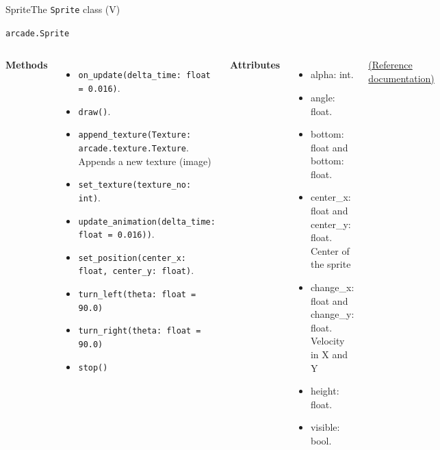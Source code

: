 \documentclass[10pt,compress]{beamer} %
\begin{document}
\begin{frame}[plain]{Sprite}{The \texttt{Sprite} class (V)}
	\begin{block}{\texttt{arcade.Sprite}}
		\smallskip
		\begin{columns}[t]
			\centering \textbf{Methods}
		\begin{itemize}
		\item \footnotesize{\texttt{on\_update(delta\_time: float = 0.016)}}. 
		\item \footnotesize{\texttt{draw()}}. 
		\item \footnotesize{\texttt{append\_texture(Texture: arcade.texture.Texture}}. \\ Appends a new texture (image)
		\item \footnotesize{\texttt{set\_texture(texture\_no: int)}}. \\
		\item \footnotesize{\texttt{update\_animation(delta\_time: float = 0.016))}}. \\
		\item \footnotesize{\texttt{set\_position(center\_x: float, center\_y: float)}}. \\
		\item \footnotesize{\texttt{turn\_left(theta: float = 90.0)}} 
		\item \footnotesize{\texttt{turn\_right(theta: float = 90.0)}} 
		\item \footnotesize{\texttt{stop()}} 
		\end{itemize}

			\centering \textbf{Attributes}
		\begin{itemize}
		\item \footnotesize{alpha: int}.
		\item \footnotesize{angle: float}. 
		\item \footnotesize{bottom: float} and \footnotesize{bottom: float}. 
		\item \footnotesize{center\_x: float} and \footnotesize{center\_y: float}.\\ Center of the sprite
		\item \footnotesize{change\_x: float} and \footnotesize{change\_y: float}.\\ Velocity in X and Y
		\item \footnotesize{height: float}. 
		\item \footnotesize{visible: bool}. 
		\end{itemize}
			\vfill
	    \href{https://api.arcade.academy/en/2.6.17/api/sprites.html\#arcade-sprite}{(Reference documentation)}
    	\end{columns}
	\end{block}	

\end{frame}
\end{document}
